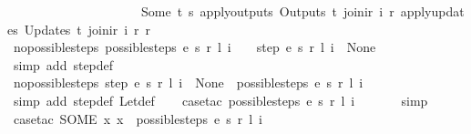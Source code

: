 \begin{isabellebody}
\ \ \ \ \ \ \ \ \ \ \ \ \ \ \ \ \ \ \ \ \ Some\ {\isacharparenleft}t{\isacharcomma}\ s{\isacharprime}{\isacharcomma}\ {\isacharparenleft}apply{\isacharunderscore}outputs\ {\isacharparenleft}Outputs\ t{\isacharparenright}\ {\isacharparenleft}join{\isacharunderscore}ir\ i\ r{\isacharparenright}{\isacharparenright}{\isacharcomma}\ {\isacharparenleft}apply{\isacharunderscore}updates\ {\isacharparenleft}Updates\ t{\isacharparenright}\ {\isacharparenleft}join{\isacharunderscore}ir\ i\ r{\isacharparenright}\ r{\isacharparenright}{\isacharparenright}\isanewline
\ \ \ \ \ \ \ \ \ \ \ \ \ \ \ \ \ \ {\isacharparenright}{\isachardoublequoteclose}\isanewline
\isanewline
{}\isamarkupfalse%
\ no{\isacharunderscore}possible{\isacharunderscore}steps{\isacharunderscore}{}{\isacharcolon}\ {\isachardoublequoteopen}possible{\isacharunderscore}steps\ e\ s\ r\ l\ i\ {\isacharequal}\ {\isacharbraceleft}{\isacharbar}{\isacharbar}{\isacharbraceright}\ {\isasymLongrightarrow}\ step\ e\ s\ r\ l\ i\ {\isacharequal}\ None{\isachardoublequoteclose}\isanewline
%
\isadelimproof
\ \ %
\endisadelimproof
%
\isatagproof
{}\isamarkupfalse%
\ {\isacharparenleft}simp\ add{\isacharcolon}\ step{\isacharunderscore}def{\isacharparenright}%
\endisatagproof
{\isafoldproof}%
%
\isadelimproof
\isanewline
%
\endisadelimproof
\isanewline
{}\isamarkupfalse%
\ no{\isacharunderscore}possible{\isacharunderscore}steps{\isacharunderscore}{}{\isacharcolon}\ {\isachardoublequoteopen}step\ e\ s\ r\ l\ i\ {\isacharequal}\ None\ {\isasymLongrightarrow}\ possible{\isacharunderscore}steps\ e\ s\ r\ l\ i\ {\isacharequal}\ {\isacharbraceleft}{\isacharbar}{\isacharbar}{\isacharbraceright}{\isachardoublequoteclose}\isanewline
%
\isadelimproof
\ \ %
\endisadelimproof
%
\isatagproof
{}\isamarkupfalse%
\ {\isacharparenleft}simp\ add{\isacharcolon}\ step{\isacharunderscore}def\ Let{\isacharunderscore}def{\isacharparenright}\isanewline
\ \ \isamarkupfalse%
\ {\isacharparenleft}case{\isacharunderscore}tac\ {\isachardoublequoteopen}possible{\isacharunderscore}steps\ e\ s\ r\ l\ i\ {\isacharequal}\ {\isacharbraceleft}{\isacharbar}{\isacharbar}{\isacharbraceright}{\isachardoublequoteclose}{\isacharparenright}\isanewline
\ \ \ \isamarkupfalse%
\ simp\isanewline
\ \ \isamarkupfalse%
\ {\isacharparenleft}case{\isacharunderscore}tac\ {\isachardoublequoteopen}SOME\ x{\isachardot}\ x\ {\isacharbar}{\isasymin}{\isacharbar}\ possible{\isacharunderscore}steps\ e\ s\ r\ l\ i{\isachardoublequoteclose}{\isacharparenright}\isanewline

\end{isabellebody}
